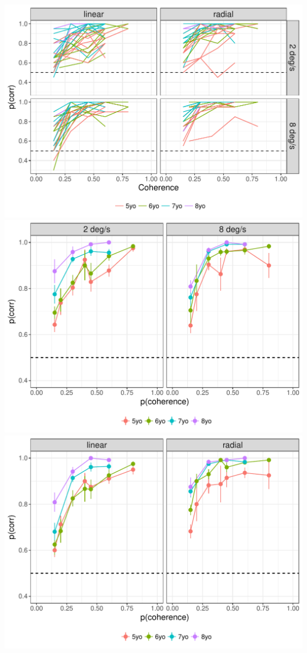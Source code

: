 \documentclass[landscape,final,paperwidth=60in,paperheight=40in,fontscale=0.285]{baposter}
\begin{document}
\begin{poster}
    {
 \begin{center}
 \includegraphics[scale=0.52,valign=t]{img/p-corr-pattern-speed-plot-1.pdf}
 \includegraphics[scale=0.52,valign=t]{img/p-corr-by-speed-and-age-plot-1.pdf}
 \includegraphics[scale=0.52,valign=t]{img/p-corr-by-pattern-and-age-plot-1.pdf}
 \end{center}
}


\end{poster}
\end{document}
